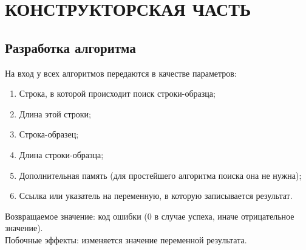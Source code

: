 \documentclass[a4paper,12pt]{article}
\begin{document}
\newpage
\section{КОНСТРУКТОРСКАЯ ЧАСТЬ}

\subsection{Разработка алгоритма}
На вход у всех алгоритмов передаются в качестве параметров:
\begin{enumerate}
\item Строка, в которой происходит поиск строки-образца;
\item Длина этой строки; 
\item Строка-образец;
\item Длина строки-образца;
\item Дополнительная память (для простейшего алгоритма поиска она не нужна);
\item Ссылка или указатель на переменную, в которую записывается результат.
\end{enumerate}
Возвращаемое значение: код ошибки (0 в случае успеха, иначе отрицательное значение). \\
Побочные эффекты: изменяется значение переменной результата.

\newpage
\end{document}
